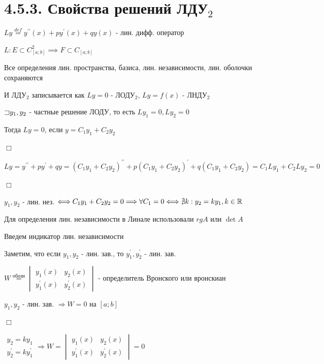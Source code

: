 \documentclass[12pt]{article}
\begin{document}
    \section{4.5.3. Свойства решений ЛДУ$\displaystyle _2$}

    \Def $\displaystyle Ly \stackrel{def}{=} y^{\prime\prime}(x) + py^\prime(x) + qy(x)$ - лин. дифф. оператор

    $\displaystyle L : E \subset C^2_{[a;b]} \implies F \subset C_{[a;b]}$

    \Nota Все определения лин. пространства, базиса, лин. независимости, лин. оболочки сохраняются

    И ЛДУ$\displaystyle _2$ записывается как $Ly = 0$ - ЛОДУ$\displaystyle _2$, $Ly = f(x)$ - ЛНДУ$\displaystyle _2$

     $\displaystyle \mathord{\sqsupset} y_1, y_2$ - частные решение ЛОДУ, то есть $\displaystyle Ly_1 = 0, Ly_2 = 0$

    Тогда $Ly = 0$, если $\displaystyle y = C_1 y_1 + C_2 y_2$

    $\Box$

    $\displaystyle Ly = y^{\prime\prime} + py^\prime + qy = (C_1 y_1 + C_2 y_2)^{\prime\prime} + p(C_1 y_1 + C_2 y_2)^{\prime} + q(C_1 y_1 + C_2 y_2) = C_1 Ly_1 + C_2 L y_2 = 0$

    $\Box$

    \Def $\displaystyle y_1, y_2$ - лин. нез. $\displaystyle \Longleftrightarrow C_1 y_1 + C_2 y_2 = 0 \Longrightarrow \forall C_1 = 0 \Longleftrightarrow \nexists k : y_2 = k y_1, k \in \mathbb{R}$

    \Mem Для определения лин. независимости в Линале использовали $rg A$ или $\det A$

    Введем индикатор лин. независимости

    Заметим, что если $\displaystyle y_1, y_2$ - лин. зав., то $\displaystyle y_1^\prime, y_2^\prime$ - лин. зав.

    \Def $\displaystyle W \stackrel{\text{обозн}}{=} \begin{vmatrix}y_1(x) & y_2(x) \\ y_1^\prime(x) & y_2^\prime(x)\end{vmatrix}$ - определитель Вронского или вронскиан

     $\displaystyle y_1, y_2$ - лин. зав. $\Longrightarrow W = 0$ на $[a;b]$

    $\Box$

    $\displaystyle \begin{matrix}y_2 = k y_1 \\ y_2^\prime = k y_1^\prime\end{matrix} \Longrightarrow W = \begin{vmatrix}y_1(x) & y_2(x) \\ y_1^\prime(x) & y_2^\prime(x)\end{vmatrix} = 0$
\end{document}
